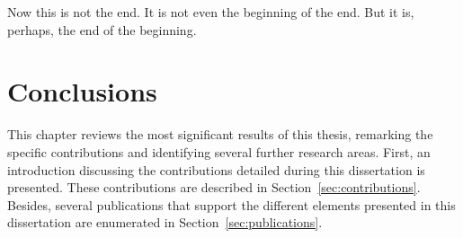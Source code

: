 

\begin{savequote}[50mm]
Now this is not the end. It is not even the beginning of the end. But it is, perhaps, the end of the beginning. 
\end{savequote}


\chapter{Conclusions}
\label{cha:Conclusions}

\ifpdf
    \graphicspath{{6_conclusion/figures/PDF/}}
\fi

This chapter reviews the most significant results of this thesis, remarking the 
specific contributions and identifying several further research areas. First, 
an introduction discussing the contributions detailed during this dissertation 
is presented. These contributions are described in Section~\ref{sec:contributions}. 
Besides, several publications that support the different elements presented in 
this dissertation are enumerated in Section~\ref{sec:publications}.





